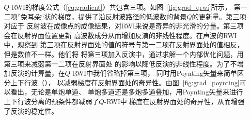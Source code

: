 $Q$-RWI的梯度公式（\ref{eq:gradient}）共包含三项。如图~\ref{fig:grad_qrwi}所示，
第一二项”兔耳朵“状的梯度，提供了沿反射波路径的低波数的背景$Q$的更新量。第三项对应于
反射波在成像点的成像结果，对RWI来说是奇异的非光滑的分量。第三项会在反射界面位置更新
高波数成分从而增加反演的非线性程度。在声波的RWI中，观察到
第三项在反射界面处的值的符号与第一二项在反射界面处的值相反，但是数值不一样。他们将
将第三项加入反演中，通过求解一个内部优化问题，用第三项来减弱第一二项在反射界面处
的影响以降低反演的非线性程度。为了不增加反演的计算量，在$Q$-RWI中我们省略掉第三项，
同时用Poynting矢量来简单区分上下行波（），
以减弱梯度在反射界面处的奇异性。由图~\ref{fig:grad_poynting}可以看出，无论是单炮单道、
单炮多道还是多炮多道叠加，用Poynting矢量来进行上下行波分离的预条件都减弱了$Q$-RWI中
梯度在反射界面处的奇异性，从而增强了反演的稳定性。

